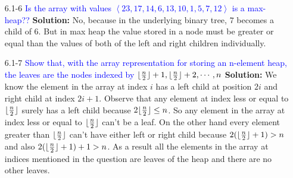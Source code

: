 \documentclass{article}
\DeclarePairedDelimiter\floor{\lfloor}{\rfloor}
\begin{document}
\begin{enumerate}
    \item[6.1-6] \textcolor{blue}{Is the array with values $\left\langle 23, 17, 14, 6, 13, 10, 1, 5, 7
,12 \right\rangle$ is a max-heap??}
    \textbf{Solution:} No, because in the underlying binary tree, $7$ becomes a child of $6$. But in max heap the value stored in a node must be greater or equal than the values of both of the left and right children individually.
    
    
    \item[6.1-7] \textcolor{blue}{Show that, with the array representation for storing an n-element heap, the leaves are the nodes indexed by $\floor{\frac{n}{2}} + 1, \floor{\frac{n}{2}} + 2, \cdots ,n$}
    \textbf{Solution:} We know the element in the array at index $i$ has a left child at position $2i$ and right child at index $2i+1$. Observe that any element at index less or equal to $\floor{\frac{n}{2}}$ surely has a left child because $2 \floor{\frac{n}{2}} \leq n$. So any element in the array at index less or equal to  $\floor{\frac{n}{2}}$ can't be a leaf. On the other hand every element greater than  $\floor{\frac{n}{2}}$ can't have either left or right child because $2 (\floor{\frac{n}{2}} + 1) > n$ and also $2 (\floor{\frac{n}{2}} + 1) + 1 > n$. As a result all the elements in the array at indices mentioned in the question are leaves of the heap and there are no other leaves.
\end{enumerate}
\end{document}
